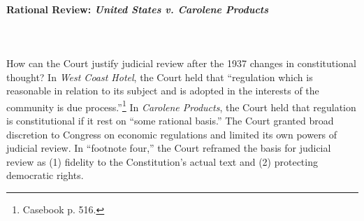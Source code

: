 \paragraph{Rational Review: \emph{United States v. Carolene 
Products}}
~\\\\
How can the Court justify judicial review after the 1937 changes in 
constitutional thought? In \emph{West Coast Hotel}, the Court held that 
``regulation which is reasonable in relation to its subject and is adopted in 
the interests of the community is due process.''\footnote{Casebook p. 516.} In 
\emph{Carolene Products}, the Court held that regulation is constitutional if 
it rest on ``some rational basis.'' The Court granted broad discretion to 
Congress on economic regulations and limited its own powers of judicial 
review. In ``footnote four,'' the Court reframed the basis for judicial review 
as (1) fidelity to the Constitution's actual text and (2) protecting 
democratic rights.

